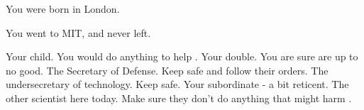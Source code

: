 \documentclass[char]{guildcamp3}
\begin{document}
\begin{itemz}[Notes]
  \item You were born in London.
  \item You went to MIT, and never left.
\end{itemz}


\begin{contacts}
  \contact{\cSciOne{}} Your child. You would do anything to help \cSciOne{\them}. 
  \contact{\cRogueTwo{}} Your double. You are sure \cRogueTwo{\they} are up to no good. 
  \contact{\cPoliOne{}} The Secretary of Defense. Keep \cPoliOne{\them} safe and follow their orders.
  \contact{\cPoliTwo{}} The undersecretary of technology. Keep \cPoliTwo{\them} safe.
  \contact{\cSpecOpTwo{}} Your subordinate - a bit reticent.
  \contact{\cSciTwo{}} The other scientist here today. Make sure they don't do anything that might harm \cSciOne{\informal}.
\end{contacts}
\end{document}
